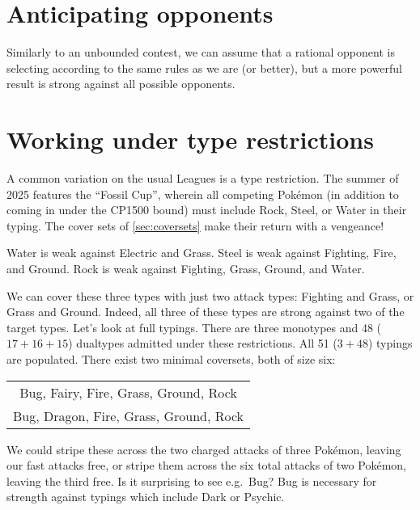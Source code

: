 \section{Anticipating opponents}
Similarly to an unbounded contest, we can assume that a rational opponent is selecting
  according to the same rules as we are (or better), but a more powerful result is
  strong against all possible opponents.

\section{Working under type restrictions}
\label{sec:typeleagues}
A common variation on the usual Leagues is a type restriction.
The summer of 2025 features the ``Fossil Cup'', wherein all competing
  Pokémon (in addition to coming in under the CP1500 bound)
  must include Rock, Steel, or Water in their typing.
The cover sets of \autoref{sec:coversets} make their return with a vengeance!

Water is weak against Electric and Grass.
Steel is weak against Fighting, Fire, and Ground.
Rock is weak against Fighting, Grass, Ground, and Water.

We can cover these three types with just two attack types: Fighting and Grass, or Grass and Ground.
Indeed, all three of these types are strong against two of the target types.
Let's look at full typings.
There are three monotypes and 48 ($17 + 16 + 15$) dualtypes admitted under these restrictions.
All 51 ($3 + 48$) typings are populated.
There exist two minimal coversets, both of size six:

\begin{table}[ht]
\begin{centering}
\begin{tabular}{c}
 Bug, Fairy, Fire, Grass, Ground, Rock\\
 Bug, Dragon, Fire, Grass, Ground, Rock\\
\end{tabular}
\end{centering}
\end{table}

We could stripe these across the two charged attacks of three Pokémon,
  leaving our fast attacks free, or stripe them across the six total
  attacks of two Pokémon, leaving the third free.
Is it surprising to see e.g.\ Bug? Bug is necessary for strength
  against typings which include Dark or Psychic.
